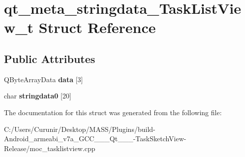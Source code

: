 \hypertarget{structqt__meta__stringdata___task_list_view__t}{}\section{qt\+\_\+meta\+\_\+stringdata\+\_\+\+Task\+List\+View\+\_\+t Struct Reference}
\label{structqt__meta__stringdata___task_list_view__t}
\subsection*{Public Attributes}
\begin{DoxyCompactItemize}
\item 
\mbox{\label{structqt__meta__stringdata___task_list_view__t_a8ad2c226ac8778a31897d25f523cbf1f}} 
Q\+Byte\+Array\+Data {\bfseries data} \mbox{[}3\mbox{]}
\item 
\mbox{\label{structqt__meta__stringdata___task_list_view__t_a42668f9de1866f4cfd191b1689185b10}} 
char {\bfseries stringdata0} \mbox{[}20\mbox{]}
\end{DoxyCompactItemize}


The documentation for this struct was generated from the following file\+:\begin{DoxyCompactItemize}
\item 
C\+:/\+Users/\+Curunir/\+Desktop/\+M\+A\+S\+S/\+Plugins/build-\/\+Android\+\_\+armeabi\+\_\+v7a\+\_\+\+G\+C\+C\+\_\+\_\+\_\+\+Qt\+\_\+\_\+\_-\/\+Task\+Sketch\+View-\/\+Release/moc\+\_\+tasklistview.\+cpp\end{DoxyCompactItemize}
